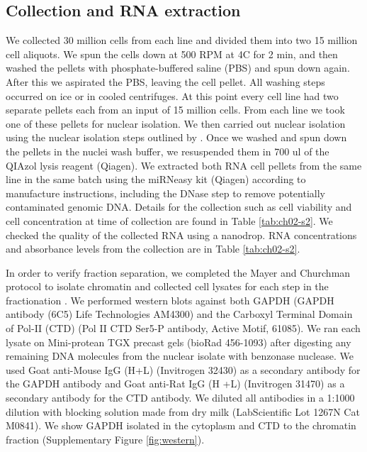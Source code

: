 \subsection{Collection and RNA extraction}\label{Collection-and-RNA-extraction}

We collected 30 million cells from each line and divided them into two 15 million cell aliquots. We spun the cells down at 500 RPM at 4C for 2 min, and then washed the pellets with phosphate-buffered saline (PBS) and spun down again. After this we aspirated the PBS, leaving the cell pellet. All washing steps occurred on ice or in cooled centrifuges. At this point every cell line had two separate pellets each from an input of 15 million cells. From each line we took one of these pellets for nuclear isolation. We then carried out nuclear isolation using the nuclear isolation steps outlined by \citep{mayer_genome-wide_2016}. Once we washed and spun down the pellets in the nuclei wash buffer, we resuspended them in 700 ul of the QIAzol lysis reagent (Qiagen). We extracted both RNA cell pellets from the same line in the same batch using the miRNeasy kit (Qiagen) according to manufacture instructions, including the DNase step to remove potentially contaminated genomic DNA. Details for the collection such as cell viability and cell concentration at time of collection are found in Table \ref{tab:ch02-s2}. We checked the quality of the collected RNA using a nanodrop. RNA concentrations and absorbance levels from the collection are in Table \ref{tab:ch02-s2}.

In order to verify fraction separation, we completed the Mayer and Churchman protocol to isolate chromatin and collected cell lysates for each step in the fractionation \citep{mayer_genome-wide_2016}. We performed western blots against both GAPDH (GAPDH antibody (6C5) Life Technologies AM4300) and the Carboxyl Terminal Domain of Pol-II (CTD) (Pol II CTD Ser5-P antibody, Active Motif, 61085). We ran each lysate on Mini-protean TGX precast gels (bioRad 456-1093) after digesting any remaining DNA molecules from the nuclear isolate with benzonase nuclease. We used Goat anti-Mouse IgG (H+L) (Invitrogen 32430) as a secondary antibody for the GAPDH antibody and Goat anti-Rat IgG (H +L) (Invitrogen 31470) as a secondary antibody for the CTD antibody. We diluted all antibodies in a 1:1000 dilution with blocking solution made from dry milk (LabScientific Lot 1267N Cat M0841). We show GAPDH isolated in the cytoplasm and CTD to the chromatin fraction (Supplementary Figure \ref{fig:western}).


